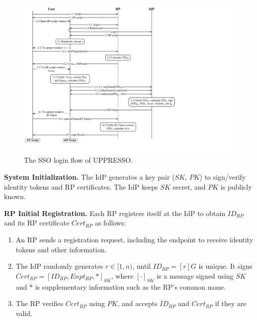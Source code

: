 \begin{figure}[bt]
  \centering
  \includegraphics[height=0.58\textheight]{fig/process-js.pdf}
  \caption{The SSO login flow of UPPRESSO.}
  \label{fig:process}
\end{figure}


\noindent \textbf{System Initialization.}
The IdP generates a key pair ($SK$, $PK$) to sign/verify identity tokens and RP certificates.
The IdP keeps $SK$ secret, and $PK$ is publicly known.


\vspace{0.8mm}
\noindent\textbf{RP Initial Registration.}
Each RP registers itself at the IdP to obtain $ID_{RP}$
 and its RP certificate $Cert_{RP}$ as follows:
\vspace{-\topsep}\begin{enumerate}
\setlength{\topsep}{0pt}
\setlength{\partopsep}{0pt}
\setlength{\itemsep}{0pt}
\setlength{\parsep}{0pt}
\setlength{\parskip}{0pt}
\item
An RP sends a registration request, including the endpoint to receive identity tokens
    and other information.
\item
The IdP randomly generates $r \in [1,n)$, until $ID_{RP} = [r]G$ is unique.
It signs $Cert_{RP} = [ID_{RP}, Enpt_{RP}, *]_{SK}$,
     where $[\cdot]_{SK}$ is a message signed using $SK$ and $*$ is supplementary information such as the RP's common name.
\item
The RP verifies $Cert_{RP}$ using $PK$,
    and accepts $ID_{RP}$ and $Cert_{RP}$ if they are valid.
\end{enumerate}

